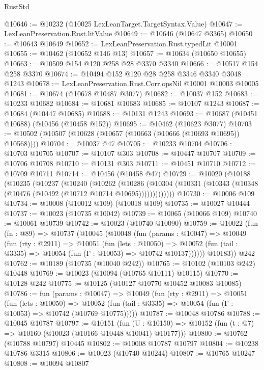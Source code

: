 \begin{lexlean}{RustStd}
\begin{coremodule}
@10646 := @10232 (@10025 LexLeanTarget.TargetSyntax.Value)
@10647 := LexLeanPreservation.Rust.litValue
@10649 := @10646 (@10647 @3365)
@10650 := @10643 @10649
@10652 := LexLeanPreservation.Rust.typedLit @10001
@10655 := @10462 (@10652 @146 @13)
@10657 := @10634 (@10650 @10655)
@10663 := @10509 @154 @120 @258 @28 @3370 @3340
@10666 := @10517 @154 @258 @3370
@10674 := @10494 @152 @120 @28 @258 @3346 @3340 @3048 @1243
@10678 := LexLeanPreservation.Rust.Corr.opsNil @10001 @10003 @10005
@10681 := @10674 (@10678 @10487 @3077)
@10682 := @10037 @152
@10683 := @10233 @10682
@10684 := @10681 @10683
@10685 := @10107 @1243
@10687 := @10684 (@10447 @10685)
@10688 := @10131 @1243
@10693 := @10687 (@10451 @10688) (@10456 (@10458 @152))
@10695 := @10462 (@10623 @3077)
@10703 := @10502 (@10507 (@10628 (@10657 (@10663 (@10666 (@10693 @10695)) @10568))))
@10704 := @10037 @47
@10705 := @10233 @10704
@10706 := @10703 @10705
@10707 := @10107 @303
@10708 := @10447 @10707
@10709 := @10706 @10708
@10710 := @10131 @303
@10711 := @10451 @10710
@10712 := @10709 @10711
@10714 := @10456 (@10458 @47)
@10729 := @10020
    (@10188
      (@10235
        (@10237
          (@10240
            (@10262
              (@10286
                (@10304 (@10331 (@10343 (@10348 (@10476 (@10492 (@10712 @10714 @10695)))))))))))))
@10730 := @10006 @109
@10734 := @10008 (@10012 @109) (@10018 @109)
@10735 := @10027 @10444
@10737 := @10023 (@10735 @10042)
@10739 := @10065 (@10066 @109)
@10740 := @10061 @10739
@10742 := @10023 (@10740 @10090)
@10759 := @10022
    (fun (fn : @89) =>
    @10737
      (@10045
        (@10048
          (fun (params : @10047) =>
          @10049
            (fun (rty : @2911) =>
            @10051
              (fun (lets : @10050) =>
              @10052 (fun (tail : @3335) => @10054 (fun (Γ : @10053) => @10742 @10137))))))
        @10183))
    @242
@10762 := @10189 (@10735 (@10040 @242))
@10765 := @10102 (@10103 @242) @10448
@10769 := @10023 (@10094 (@10765 @10111) @10115)
@10770 := @10128 @242
@10775 := @10125 (@10127 @10770 @10452 @10083 @10085)
@10786 := fun (params : @10047) =>
  @10049
    (fun (rty : @2911) =>
    @10051
      (fun (lets : @10050) =>
      @10052 (fun (tail : @3335) => @10054 (fun (Γ : @10053) => @10742 (@10769 @10775)))))
@10787 := @10048 @10786
@10788 := @10045 @10787
@10797 := @10151
    (fun (U : @10150) => @10152 (fun (t : @7) => @10160 (@10023 (@10166 @10448 @10041) @10177)))
@10800 := @10762 (@10788 @10797) @10445
@10802 := @10008 @10787 @10797
@10804 := @10238 @10786 @3315
@10806 := @10023 (@10740 @10244)
@10807 := @10765 @10247
@10808 := @10094 @10807

\end{coremodule}
\end{lexlean}
